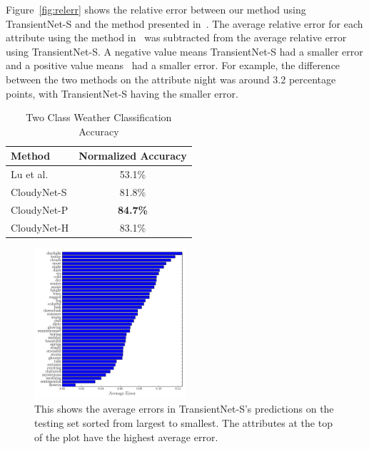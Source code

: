 \documentclass{article}
\newcommand{\figref}[1]{Figure~\ref{fig:#1}}
\begin{document}
\figref{relerr} shows the relative error between our method using TransientNet-S
and the method presented in~\cite{Laffont14}.  The average relative error 
for each attribute using the method in~\cite{Laffont14} was subtracted from
the average relative error using TransientNet-S.  A negative value means TransientNet-S
had a smaller error and a positive value means~\cite{Laffont14} had a smaller
error.  For example, the difference between the two methods on the attribute
night was around 3.2 percentage points, with TransientNet-S having the smaller 
error.

 
%
%
%

\begin{table}[t]
	\centering
	\begin{tabular}{ | l | c | }
		\hline
			Method & Normalized Accuracy \\ \hline
			Lu et al.~\cite{lutwoclass}& 53.1\% \\ \hline
			CloudyNet-S & 81.8\% \\ \hline
			CloudyNet-P & \textbf{84.7\%} \\ \hline
			CloudyNet-H & 83.1\% \\ 
		\hline
	\end{tabular}
	\caption{Two Class Weather Classification Accuracy}
	\label{tbl:twoclass}
\end{table}

\begin{figure}[t]
	\centering
		\includegraphics[width=0.5\textwidth]{figs/sorted_err_cmr.pdf}
		\caption{This shows the average errors in TransientNet-S's predictions on the 
						 testing set sorted from largest to smallest.  The attributes at 
						 the top of the plot have the highest average error.}
		\label{fig:sort}
\end{figure}
\end{document}

